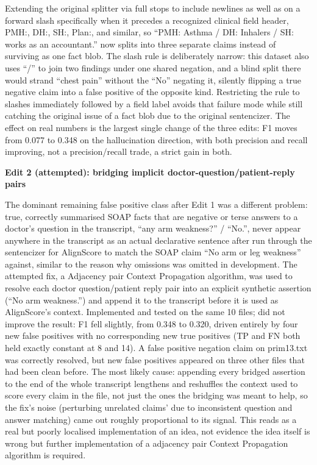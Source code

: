 \documentclass[11pt,a4paper]{article}
\begin{document}
Extending the original splitter via full stops to include newlines as well as on a forward slash specifically when it precedes a recognized clinical field header, PMH:, DH:, SH:, Plan:, and similar,  so “PMH: Asthma / DH: Inhalers / SH: works as an accountant.” now splits into three separate claims instead of surviving as one fact blob. The slash rule is deliberately narrow: this dataset also uses “/” to join two findings under one shared negation, and a blind split there would strand “chest pain” without the “No” negating it, silently flipping a true negative claim into a false positive of the opposite kind. Restricting the rule to slashes immediately followed by a field label avoids that failure mode while still catching the original issue of a fact blob due to the original sentencizer. The effect on real numbers is the largest single change of the three edits: F1 moves from 0.077 to 0.348  on the hallucination direction, with both precision and recall improving, not a precision/recall trade, a strict gain in both.

\textbf{Edit 2 (attempted): bridging implicit doctor-question/patient-reply pairs }

The dominant remaining false positive class after Edit 1 was a different problem: true, correctly summarised SOAP facts that are negative or terse answers to a doctor’s question in the transcript, “any arm weakness?” / “No.”, never appear anywhere in the transcript as an actual declarative sentence after run through the sentencizer for AlignScore to match the SOAP claim “No arm or leg weakness” against, similar to the reason why omissions was omitted in development. The attempted fix,  a Adjacency pair Context Propagation algorithm, was used to resolve each doctor question/patient reply pair into an explicit synthetic assertion (“No arm weakness.”) and append it to the transcript before it is used as AlignScore’s context. Implemented and tested on the same 10 files; did not improve the result: F1 fell slightly, from 0.348 to 0.320, driven entirely by four new false positives with no corresponding new true positives (TP and FN both held exactly constant at 8 and 14). A false positive negation claim on prim13.txt was correctly resolved, but new false positives appeared on three other files that had been clean before. The most likely cause: appending every bridged assertion to the end of the whole transcript lengthens and reshuffles the context used to score every claim in the file, not just the ones the bridging was meant to help, so the fix’s noise (perturbing unrelated claims’ due to inconsistent question and answer matching) came out roughly proportional to its signal. This reads as a real but poorly localised implementation of an idea, not evidence the idea itself is wrong  but further implementation of a adjacency pair Context Propagation algorithm is required.
\end{document}
